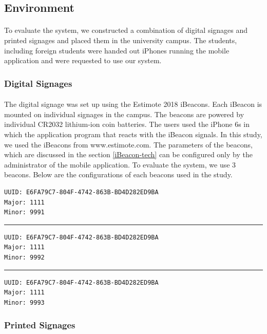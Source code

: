 \documentclass[12pt]{article}
\begin{document}
\subsection{Environment}
\label{env}
\paragraph{}To evaluate the system, we constructed a combination of digital signages and printed signages and placed them in the university campus. The students, including foreign students were handed out iPhones running the mobile application and were requested to use our system.

\subsubsection{Digital Signages}
\paragraph{}The digital signage was set up using the Estimote 2018 iBeacons. Each iBeacon is mounted on individual signages in the campus. The beacons are powered by individual CR2032 lithium-ion coin batteries. The users used the iPhone 6s in which the application program that reacts with the iBeacon signals. In this study, we used the iBeacons from www.estimote.com. The parameters of the beacons, which are discussed in the section \ref{iBeacon-tech} can be configured only by the administrator of the mobile application. To evaluate the system, we use 3 beacons. Below are the configurations of each beacons used in the study.

\begin{lstlisting}
UUID: E6FA79C7-804F-4742-863B-BD4D282ED9BA
Major: 1111
Minor: 9991
\end{lstlisting}

\noindent\rule{13cm}{0.4pt}

\begin{lstlisting}
UUID: E6FA79C7-804F-4742-863B-BD4D282ED9BA
Major: 1111
Minor: 9992
\end{lstlisting}

\noindent\rule{13cm}{0.4pt}

\begin{lstlisting}
UUID: E6FA79C7-804F-4742-863B-BD4D282ED9BA
Major: 1111
Minor: 9993
\end{lstlisting}

\subsubsection{Printed Signages}
\label{printed-signages}
\end{document}
